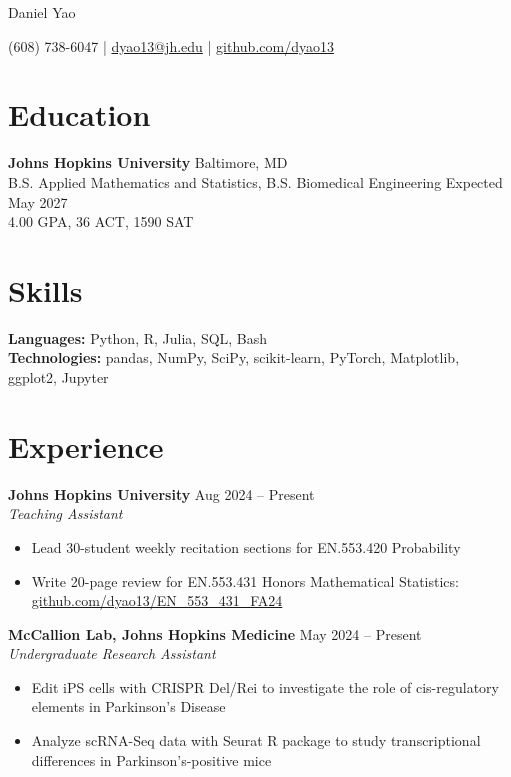 \documentclass[11pt]{article}       %
\begin{document}
\centerline{\Huge Daniel Yao}

\vspace{5pt}

\centerline{(608) 738-6047 | \href{mailto:dyao13@jh.edu}{dyao13@jh.edu} | \href{https://github.com/dyao13/}{github.com/dyao13}}

\vspace{-9pt}

\section*{Education}
\textbf{Johns Hopkins University} \hfill Baltimore, MD \\
B.S. Applied Mathematics and Statistics, B.S. Biomedical Engineering \hfill Expected May 2027 \\
4.00 GPA, 36 ACT, 1590 SAT

\vspace{-9pt}

\section*{Skills}
\textbf{Languages:} Python, R, Julia, SQL, Bash \\
\textbf{Technologies:} pandas, NumPy, SciPy, scikit-learn, PyTorch, Matplotlib, ggplot2, Jupyter

\vspace{-9pt}

\section*{Experience}
\textbf{Johns Hopkins University} \hfill Aug 2024 – Present \\
\textit{Teaching Assistant} \vspace{-9pt} \\
\begin{itemize}
  \item Lead 30-student weekly recitation sections for EN.553.420 Probability
  \item Write 20-page review for EN.553.431 Honors Mathematical Statistics: \href{https://github.com/dyao13/EN\_553\_431\_FA24}{github.com/dyao13/EN\_553\_431\_FA24}
\end{itemize}

\textbf{McCallion Lab, Johns Hopkins Medicine} \hfill May 2024 – Present \\
\textit{Undergraduate Research Assistant} \vspace{-9pt} \\
\begin{itemize}
  \item Edit iPS cells with CRISPR Del/Rei to investigate the role of cis-regulatory elements in Parkinson’s Disease
  \item Analyze scRNA-Seq data with Seurat R package to study transcriptional differences in Parkinson’s-positive mice
\end{itemize}
\end{document}
